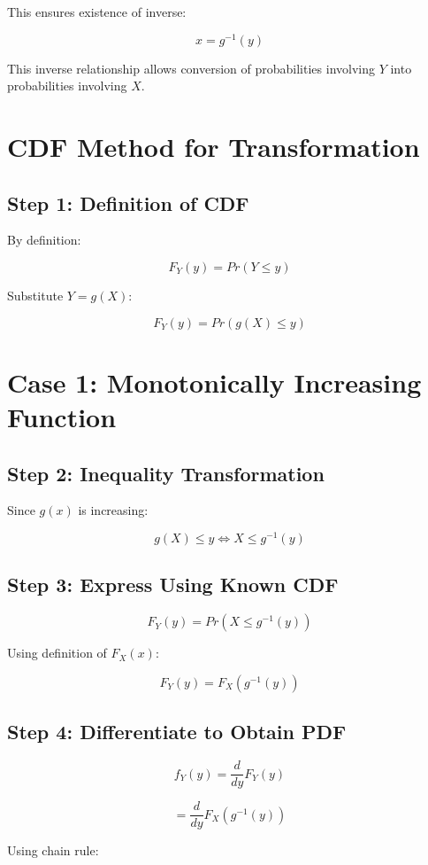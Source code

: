 \documentclass[12pt]{article}
\begin{document}
This ensures existence of inverse:

\[
x = g^{-1}(y)
\]

This inverse relationship allows conversion of probabilities involving $Y$ into probabilities involving $X$.

\section{CDF Method for Transformation}

\subsection{Step 1: Definition of CDF}

By definition:

\[
F_Y(y) = Pr(Y \le y)
\]

Substitute $Y = g(X)$:

\[
F_Y(y) = Pr(g(X) \le y)
\]

\section{Case 1: Monotonically Increasing Function}

\subsection{Step 2: Inequality Transformation}

Since $g(x)$ is increasing:

\[
g(X) \le y \iff X \le g^{-1}(y)
\]

\subsection{Step 3: Express Using Known CDF}

\[
F_Y(y)
=
Pr(X \le g^{-1}(y))
\]

Using definition of $F_X(x)$:

\[
\boxed{
F_Y(y) = F_X(g^{-1}(y))
}
\]

\subsection{Step 4: Differentiate to Obtain PDF}

\[
f_Y(y)
=
\frac{d}{dy}F_Y(y)
\]

\[
=
\frac{d}{dy}F_X(g^{-1}(y))
\]

Using chain rule:
\end{document}
